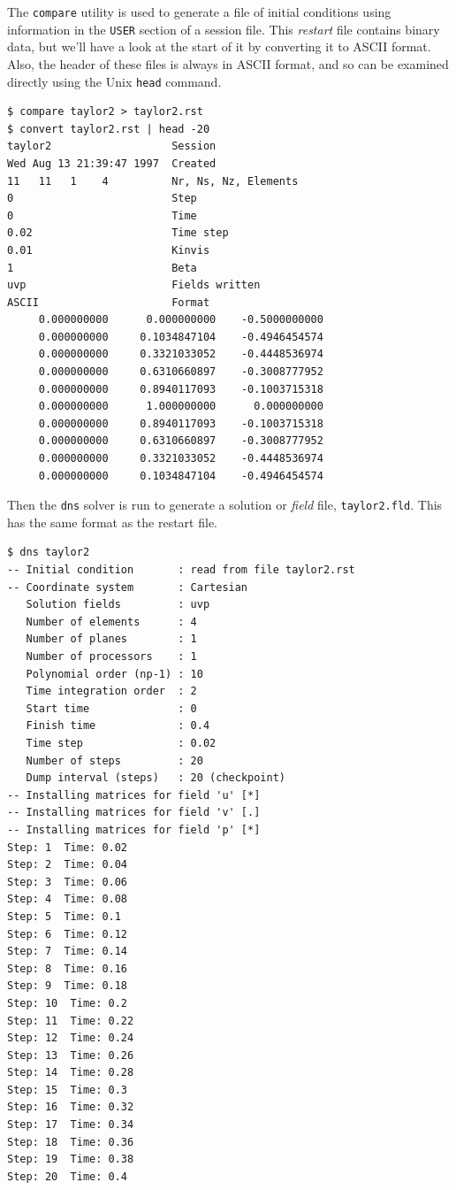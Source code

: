 \documentclass[11pt]{report}
\begin{document}
The \texttt{compare} utility is used to generate a file of initial
conditions using information in the \verb|USER| section of a session
file.  This \emph{restart} file contains binary data, but we'll have a
look at the start of it by converting it to ASCII format.  Also, the
header of these files is always in ASCII format, and so can be
examined directly using the Unix \texttt{head} command.  {\small
\begin{verbatim}
$ compare taylor2 > taylor2.rst
$ convert taylor2.rst | head -20
taylor2                   Session
Wed Aug 13 21:39:47 1997  Created
11   11   1    4          Nr, Ns, Nz, Elements
0                         Step
0                         Time
0.02                      Time step
0.01                      Kinvis
1                         Beta
uvp                       Fields written
ASCII                     Format
     0.000000000      0.000000000    -0.5000000000 
     0.000000000     0.1034847104    -0.4946454574 
     0.000000000     0.3321033052    -0.4448536974 
     0.000000000     0.6310660897    -0.3008777952 
     0.000000000     0.8940117093    -0.1003715318 
     0.000000000      1.000000000      0.000000000 
     0.000000000     0.8940117093    -0.1003715318 
     0.000000000     0.6310660897    -0.3008777952 
     0.000000000     0.3321033052    -0.4448536974 
     0.000000000     0.1034847104    -0.4946454574 
\end{verbatim}
}

Then the \texttt{dns} solver is run to generate a solution or
\emph{field} file, \texttt{taylor2.fld}.  This has the same format
as the restart file.
{\small
\begin{verbatim}
$ dns taylor2
-- Initial condition       : read from file taylor2.rst
-- Coordinate system       : Cartesian
   Solution fields         : uvp
   Number of elements      : 4
   Number of planes        : 1
   Number of processors    : 1
   Polynomial order (np-1) : 10
   Time integration order  : 2
   Start time              : 0
   Finish time             : 0.4
   Time step               : 0.02
   Number of steps         : 20
   Dump interval (steps)   : 20 (checkpoint)
-- Installing matrices for field 'u' [*]
-- Installing matrices for field 'v' [.]
-- Installing matrices for field 'p' [*]
Step: 1  Time: 0.02
Step: 2  Time: 0.04
Step: 3  Time: 0.06
Step: 4  Time: 0.08
Step: 5  Time: 0.1
Step: 6  Time: 0.12
Step: 7  Time: 0.14
Step: 8  Time: 0.16
Step: 9  Time: 0.18
Step: 10  Time: 0.2
Step: 11  Time: 0.22
Step: 12  Time: 0.24
Step: 13  Time: 0.26
Step: 14  Time: 0.28
Step: 15  Time: 0.3
Step: 16  Time: 0.32
Step: 17  Time: 0.34
Step: 18  Time: 0.36
Step: 19  Time: 0.38
Step: 20  Time: 0.4
\end{verbatim}
}
\end{document}
